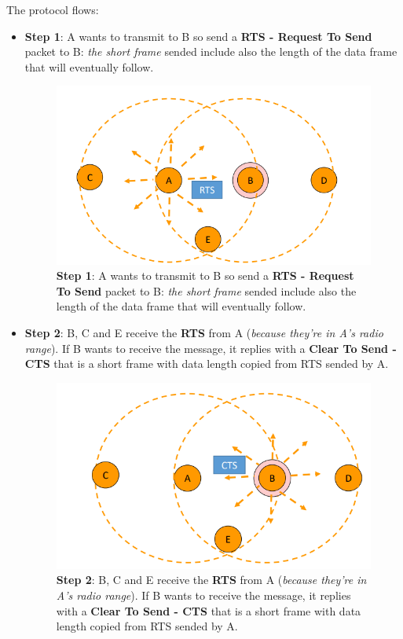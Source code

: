 \documentclass[10pt,a4paper]{report}
\theoremstyle{definition}
\begin{document}
The protocol flows:
\begin{itemize}
	\item 
	\textbf{Step 1}: A wants to transmit to B so send a \textbf{RTS - Request To Send} packet to B: \textit{the short frame} sended include also the length of the data frame that will eventually follow.

	\begin{figure}[h!]
		\centering
		\includegraphics[scale=0.50]{images/Pasted image 20230225102406.png}
		\caption{\textbf{Step 1}: A wants to transmit to B so send a \textbf{RTS - Request To Send} packet to B: \textit{the short frame} sended include also the length of the data frame that will eventually follow.}
	\end{figure}
	
	\item 
	\textbf{Step 2}: B, C and E receive the \textbf{RTS} from A (\textit{because they're in A's radio range}).
	If B wants to receive the message, it replies with a \textbf{Clear To Send - CTS} that is a short frame with data length copied from RTS sended by A.
	\begin{figure}[h]
		\centering
		\includegraphics[scale=0.50]{images/Pasted image 20230225102447.png}
		\caption{	\textbf{Step 2}: B, C and E receive the \textbf{RTS} from A (\textit{because they're in A's radio range}).
			If B wants to receive the message, it replies with a \textbf{Clear To Send - CTS} that is a short frame with data length copied from RTS sended by A.}
	\end{figure}
	

\end{itemize}
\end{document}
